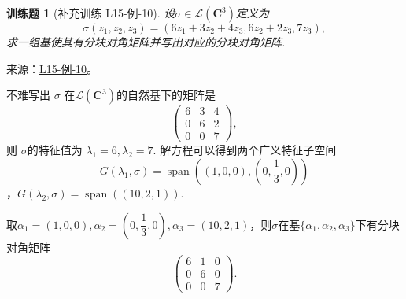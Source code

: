 \documentclass[UTF8,12pt,a4paper,fontset=fandol]{ctexart}
\newtheorem{exercise}{训练题}[section]
\begin{document}
\begin{exercise}[补充训练 L15-例-10]\label{prob:L15-例-10}
设$\sigma\in \mathcal{L}(\mathbf{C}^3)$定义为
    \[\sigma(z_1,z_2,z_3)=(6z_1+3z_2+4z_3,6z_2+2z_3,7z_3),\]求一组基使其有分块对角矩阵并写出对应的分块对角矩阵.
\end{exercise}
\noindent 来源：\href{https://github.com/yhwu-is/Linear-Algebra-Left-Undone/blob/new/%E8%AE%B2%E4%B9%89/%E4%B8%93%E9%A2%98/15%20%E7%9B%B8%E4%BC%BC%E6%A0%87%E5%87%86%E5%BD%A2%EF%BC%9A%E5%A4%8D%E6%95%B0%E5%9F%9F%E4%B8%8A%E7%9A%84%E5%B0%9D%E8%AF%95%E4%B8%8E%E7%90%86%E8%AE%BA.tex}{L15-例-10}。
\begin{solve}
不难写出 $\sigma$ 在$\mathcal{L}(\mathbf{C}^3)$的自然基下的矩阵是
    \[ \begin{pmatrix}
        6 & 3 & 4 \\
        0 & 6 & 2 \\
        0 & 0 & 7
    \end{pmatrix}, \]
    则 $\sigma$的特征值为 $\lambda_1 = 6,\lambda_2 = 7$. 解方程可以得到两个广义特征子空间 \[G(\lambda_1,\sigma) = \operatorname{span}\left((1,0,0),\left(0,\dfrac{1}{3},0\right)\right)\]，$G(\lambda_2,\sigma)=\operatorname{span}((10,2,1))$.

    取$\alpha_1=(1,0,0),\alpha_2=\left(0,\dfrac{1}{3},0\right),\alpha_3=(10,2,1)$，则$\sigma$在基$\{\alpha_1,\alpha_2,\alpha_3\}$下有分块对角矩阵
    \[ \begin{pmatrix}
        6 & 1 & 0 \\
        0 & 6 & 0 \\
        0 & 0 & 7
    \end{pmatrix}. \]
\end{solve}
\end{document}

